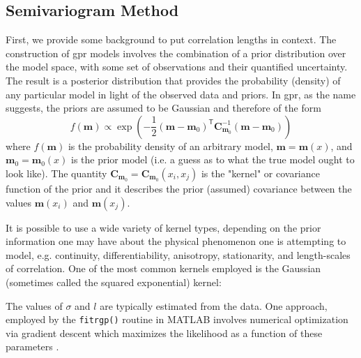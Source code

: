 \documentclass[preprint,12pt]{elsarticle}
\begin{document}
    \subsection{Semivariogram Method}

    First, we provide some background to put correlation lengths in context. The construction of \gls{gpr} models involves the combination of a prior distribution over the model space, with some set of observations and their quantified uncertainty. The result is a posterior distribution that provides the probability (density) of any particular model in light of the observed data and priors. In \gls{gpr}, as the name suggests, the priors are assumed to be Gaussian and therefore of the form
    \begin{equation}
        f\!\left(\mathbf{m}\right) \propto \exp{\left(-\frac{1}{2} {\left(\mathbf{m}-\mathbf{m}_0\right)}^{\mathsf{T}} \mathbf{C}_{\mathbf{m}_0}^{-1} {\left(\mathbf{m}-\mathbf{m}_0\right)}\right)}
    \end{equation}
    where $f\!\left(\mathbf{m}\right)$ is the probability density of an arbitrary model, $\mathbf{m} = \mathbf{m}\!\left(x\right)$, and $\mathbf{m}_0 = \mathbf{m}_0\!\left(x\right)$ is the prior model (i.e. a guess as to what the true model ought to look like). The quantity $\mathbf{C}_{\mathbf{m}_0} = \mathbf{C}_{\mathbf{m}_0}\!\left(x_i,x_j\right)$ is the "kernel" or covariance function of the prior and it describes the prior (assumed) covariance between the values $\mathbf{m}\!\left(x_i\right)$ and $\mathbf{m}\!\left(x_j\right)$.
    
    It is possible to use a wide variety of kernel types, depending on the prior information one may have about the physical phenomenon one is attempting to model, e.g. continuity, differentiability, anisotropy, stationarity, and length-scales of correlation. One of the most common kernels employed is the Gaussian (sometimes called the squared exponential) kernel:
    
    
    The values of $\sigma$ and $l$ are typically estimated from the data. One approach, employed by the \texttt{fitrgp()} routine in MATLAB involves numerical optimization via gradient descent which maximizes the likelihood as a function of these parameters \cite{ExactGPRMethod}.
    
\end{document}
